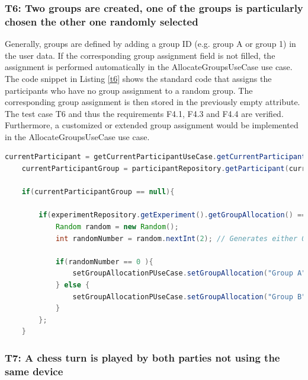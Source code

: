 \newpage

\subsubsection*{T6: Two groups are created, one of the groups is particularly chosen the other one randomly selected}

Generally, groups are defined by adding a group ID (e.g. group A or group 1) in the user data. If the corresponding group assignment field is not filled, the assignment is performed automatically in the AllocateGroupsUseCase use case. The code snippet in Listing \ref{t6} shows the standard code that assigns the participants who have no group assignment to a random group. The corresponding group assignment is then stored in the previously empty attribute. The test case T6 and thus the requirements F4.1, F4.3 and F4.4 are verified. Furthermore, a customized or extended group assignment would be implemented in the AllocateGroupsUseCase use case.


\begin{lstlisting}[language=java,label=t6,lineskip={0pt}, caption=Collect time needed to conduct experiment (b), basicstyle=\scriptsize, captionpos=b]
    currentParticipant = getCurrentParticipantUseCase.getCurrentParticipant();
    currentParticipantGroup = participantRepository.getParticipant(currentParticipant).getGroupAllocation();
    
    if(currentParticipantGroup == null){
    
        if(experimentRepository.getExperiment().getGroupAllocation() == "random"){
            Random random = new Random();
            int randomNumber = random.nextInt(2); // Generates either 0 or 1
    
            if(randomNumber == 0 ){
                setGroupAllocationPUseCase.setGroupAllocation("Group A", currentParticipant);
            } else {
                setGroupAllocationPUseCase.setGroupAllocation("Group B", currentParticipant);
            }
        };
    }
\end{lstlisting}

\newpage

\subsubsection*{T7: A chess turn is played by both parties not using the same device}

